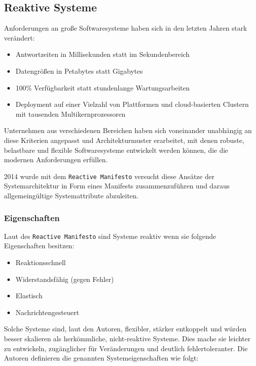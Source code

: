 \subsection{Reaktive Systeme}
\label{subsection:reaktive_systeme}
Anforderungen an große Softwaresysteme haben sich in den letzten Jahren stark verändert:
\begin{itemize}
  \item Antwortzeiten in Millisekunden statt im Sekundenbereich
  \item Datengrößen in Petabytes statt Gigabytes
  \item 100\% Verfügbarkeit statt stundenlange Wartungsarbeiten
  \item Deployment auf einer Vielzahl von Plattformen und cloud-basierten Clustern mit tausenden Multikernprozessoren
\end{itemize}

Unternehmen aus verschiedenen Bereichen haben sich voneinander unabhängig an diese Kriterien angepasst und Architekturmuster
erarbeitet, mit denen robuste, belastbare und flexible Softwaresysteme entwickelt werden können, die die modernen Anforderungen
erfüllen.

2014 wurde mit dem \verb|Reactive Manifesto| versucht diese Ansätze der Systemarchitektur in Form eines Manifests zusammenzuführen
und daraus allgemeingültige Systemattribute abzuleiten.

\subsubsection{Eigenschaften}
\label{subsubsec:reaktive_systeme_eigenschaften}
Laut des \verb|Reactive Manifesto| sind Systeme reaktiv wenn sie folgende Eigenschaften besitzen:
\begin{itemize}
  \item Reaktionsschnell
  \item Widerstandsfähig (gegen Fehler)
  \item Elastisch
  \item Nachrichtengesteuert
\end{itemize}
Solche Systeme sind, laut den Autoren, flexibler, stärker entkoppelt und würden besser skalieren als herkömmliche, nicht-reaktive Systeme.
Dies mache sie leichter zu entwickeln, zugänglicher für Veränderungen und deutlich fehlertoleranter.
\newline\newline
Die Autoren definieren die genannten Systemeigenschaften wie folgt:
